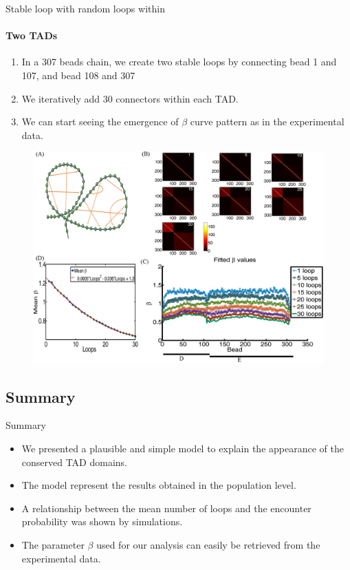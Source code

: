 \documentclass[8pt]{beamer}
\begin{document}
\begin{frame}{Stable loop with random loops within}
\framesubtitle{Two TADs}
\begin{enumerate}
\item In a 307 beads chain, we create two stable loops by connecting bead 1 and 107, and bead 108 and 307
\item We iteratively add 30 connectors within each TAD.
\item We can start seeing the emergence of $\beta$ curve pattern as in the experimental data.
\end{enumerate}
\begin{figure}[H]
\includegraphics[scale=0.35]{Figure04_TwoTADs0To30RandomLoops307Beads}
\end{figure}
\end{frame}


\subsection{Summary}\label{subsection_summaryAndFutureWork}

\begin{frame}{Summary}
\begin{itemize}
\item We presented a plausible and simple model to explain the appearance of the conserved TAD domains. 
\item The model represent the results obtained in the population level.
\item A relationship between the mean number of loops and the encounter probability was shown by simulations.
\item The parameter $\beta$ used for our analysis can easily be retrieved from the experimental data. 
\end{itemize}
\end{frame}
\end{document}
